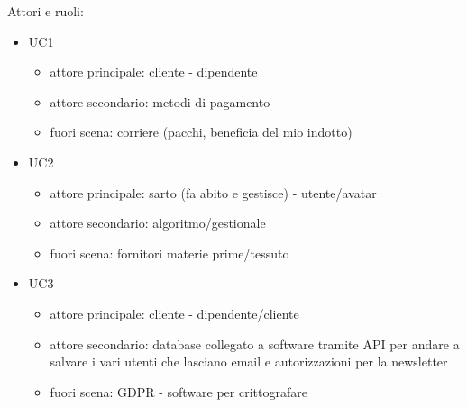 \documentclass[12pt]{article}
\begin{document}
Attori e ruoli:
\begin{itemize}
	\item UC1
		\begin{itemize}
		\item attore principale: cliente - dipendente  
		\item attore secondario: metodi di pagamento 
		\item fuori scena: corriere (pacchi, beneficia del mio indotto)
		\end{itemize}
	\item UC2
		\begin{itemize}
		\item attore principale: sarto (fa abito e gestisce) - utente/avatar 
		\item attore secondario: algoritmo/gestionale
		\item fuori scena: fornitori materie prime/tessuto 
		\end{itemize}
	\item UC3
		\begin{itemize}
		\item attore principale: cliente - dipendente/cliente 
		\item attore secondario: database collegato a software tramite API per andare a salvare i vari utenti che lasciano email e autorizzazioni per la newsletter 
		\item fuori scena: GDPR - software per crittografare 
		\end{itemize}
\end{itemize}
\end{document}
